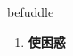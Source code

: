 
\begin{frame}
{\huge befuddle}
\begin{center}
\begin{enumerate}\Large
  \item \textbf{使困惑}
\end{enumerate}
\end{center}
\end{frame}
